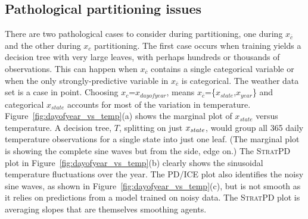 \documentclass[12pt]{article}
\newcommand{\figref}[1]{Figure~\ref{#1}}
\newcommand{\spd}{\fontfamily{cmr}\textsc{\small StratPD}}
\newcommand{\xnc}{$x_{\overline{c}}$}
\begin{document}
\subsection{Pathological partitioning issues}

There are two pathological cases to consider during partitioning, one during \xnc{} and the other during $x_c$ partitioning.  The first case occurs when training yields a decision tree with very large leaves, with perhaps hundreds or thousands of observations.  This can happen when \xnc{} contains a single categorical variable or when the only strongly-predictive variable in \xnc{} is categorical.  The weather data set is a case in point. Choosing $x_c$=$x_{dayofyear}$, means \xnc{}=\{$x_{state}$,$x_{year}$\} and categorical $x_{state}$ accounts for most of the variation in temperature.  \figref{fig:dayofyear_vs_temp}(a) shows the marginal plot of $x_{state}$ versus temperature. A decision tree, $T$, splitting on just $x_{\it state}$, would group all 365 daily temperature observations for a single state into just one leaf. (The marginal plot is showing the complete sine waves but from the side, edge on.)   The \spd{} plot in \figref{fig:dayofyear_vs_temp}(b) clearly shows the sinusoidal temperature fluctuations over the year. The PD/ICE plot also identifies the noisy sine waves, as shown in \figref{fig:dayofyear_vs_temp}(c), but is not smooth as it relies on predictions from a model trained on noisy data. The \spd{} plot is averaging slopes that are themselves smoothing agents.
\end{document}
